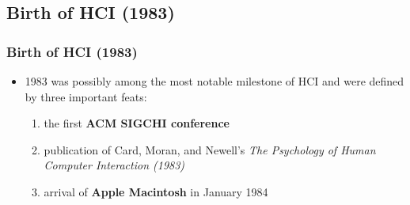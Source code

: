 \documentclass{beamer}
\begin{document}


\subsection{Birth of HCI (1983)} %

\begin{frame}
\frametitle{Birth of HCI (1983)}
\begin{itemize}
	\item 1983 was possibly among the most notable milestone of HCI and were defined by three important feats: 
	\begin{enumerate}
		\item the first \textbf{ACM SIGCHI conference}
		\item publication of Card, Moran, and Newell's \textit{The Psychology of Human Computer Interaction (1983)}
		\item arrival of \textbf{Apple Macintosh} in January 1984
	\end{enumerate}
\end{itemize}
\end{frame}
\end{document}
